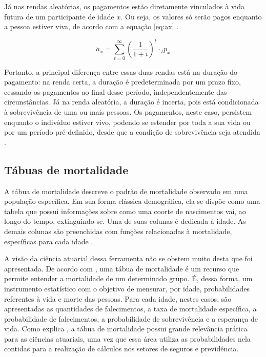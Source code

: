 Já nas rendas aleatórias, os pagamentos estão diretamente vinculados à vida futura de um participante de idade $x$. Ou seja, os valores só serão pagos enquanto a pessoa estiver viva, de acordo com a equação \ref{eq:ax} \cite{bowers2006}.

\begin{equation}
    \ddot{a}_{x} = \sum_{t=0}^{\infty} \left(\frac{1}{1+i}\right)^t \cdot {}_{t}p_{x}
    \label{eq:ax}
\end{equation}

Portanto, a principal diferença entre essas duas rendas está na duração do pagamento: na renda certa, a duração é predeterminada por um prazo fixo, cessando os pagamentos ao final desse período, independentemente das circunstâncias. Já na renda aleatória, a duração é incerta, pois está condicionada à sobrevivência de uma ou mais pessoas. Os pagamentos, neste caso, persistem enquanto o indivíduo estiver vivo, podendo se estender por toda a sua vida ou por um período pré-definido, desde que a condição de sobrevivência seja atendida \cite{vilanoca1969}.

\subsection{Tábuas de mortalidade}

A tábua de mortalidade descreve o padrão de mortalidade observado em uma população específica. Em sua forma clássica demográfica, ela se dispõe como uma tabela que possui informações sobre como uma coorte de nascimentos vai, ao longo do tempo, extinguindo-se. Uma de suas colunas é dedicada à idade. As demais colunas são preenchidas com funções relacionadas à mortalidade, específicas para cada idade \cite{preston2001demography}. 

A visão da ciência atuarial dessa ferramenta não se obstem muito desta que foi apresentada. De acordo com , uma tábua de mortalidade é um recurso que permite entender a mortalidade de um determinado grupo. É, dessa forma, um instrumento estatístico com o objetivo de mensurar, por idade, probabilidades referentes à vida e morte das pessoas. Para cada idade, nestes casos, são apresentadas as quantidades de falecimentos, a taxa de mortalidade específica, a probabilidade de falecimentos, a probabilidade de sobrevivência e a esperança de vida. Como explica , a tábua de mortalidade possui grande relevância prática para as ciências atuariais, uma vez que essa área utiliza as probabilidades nela contidas para a realização de cálculos nos setores de seguros e previdência.


